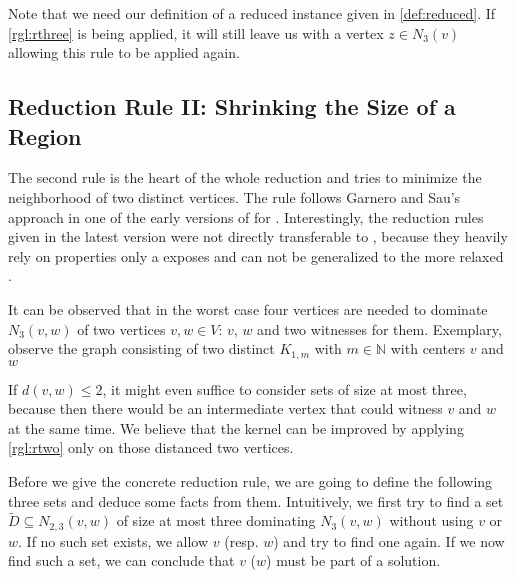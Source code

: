 Note that we need our definition of a reduced instance given in \ref{def:reduced}. If \cref{rgl:rthree} is being applied, it will still leave us with a vertex $z\in N_3(v)$ allowing this rule to be applied again.

\subsection{Reduction Rule II: Shrinking the Size of a Region}

The second rule is the heart of the whole reduction and tries to minimize the neighborhood of two distinct vertices. The rule follows Garnero and Sau's approach in one of the early versions of \cite{Garnero2014} for \ptdom. Interestingly, the reduction rules given in the latest version were not directly transferable to \psdom, because they heavily rely on properties only a \ptdom exposes and can not be generalized to the more relaxed \psdom.





It can be observed that in the worst case four vertices are needed to dominate $N_3(v,w)$ of two vertices $v,w \in V$: $v$, $w$ and two witnesses for them. Exemplary, observe the graph consisting of two distinct $K_{1,m}$ with $m \in \mathbb{N}$ with centers $v$ and $w$

If $d(v,w) \leq 2$, it might even suffice to consider sets of size at most three, because then there would be an intermediate vertex that could witness $v$ and $w$ at the same time. We believe that the kernel can be improved by applying \cref{rgl:rtwo} only on those distanced two vertices. 

Before we give the concrete reduction rule, we are going to define the following three sets and deduce some facts from them. Intuitively, we first try to find a set $\tilde D \subseteq N_{2,3}(v,w)$ of size at most three dominating $N_3(v,w)$ without using $v$ or $w$. If no such set exists, we allow $v$ (resp. $w$) and try to find one again. If we now find such a set, we can conclude that $v$ ($w$) must be part of a solution.

